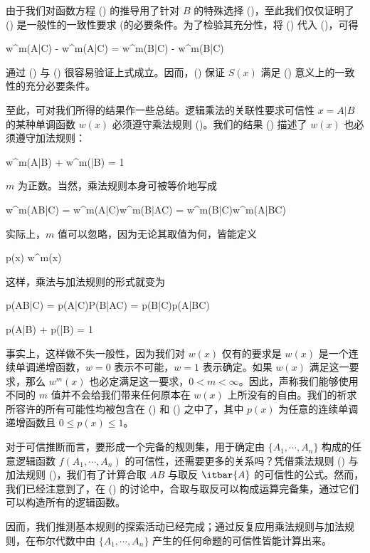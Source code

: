 由于我们对函数方程 (\in[2-45]) 的推导用了针对 $B$ 的特殊选择 (\in[2-41])，至此我们仅仅证明了 (\in[2-58]) 是一般性的一致性要求 (\in[2-40] 的必要条件。为了检验其充分性，将 (\in[2-58]) 代入 (\in[2-40])，可得

\placeformula[2-59]
\startformula
w^m(A|C) - w^m(A|C) = w^m(B|C) - w^m(B|C)
\stopformula

通过 (\in[2-28]) 与 (\in[2-38]) 很容易验证上式成立。因而，(\in[2-58]) 保证 $S(x)$ 满足 (\in[2-40]) 意义上的一致性的充分必要条件。

至此，可对我们所得的结果作一些总结。逻辑乘法的关联性要求可信性 $x = A|B$ 的某种单调函数 $w(x)$ 必须遵守乘法规则 (\in[2-28])。我们的结果 (\in[2-58]) 描述了 $w(x)$ 也必须遵守加法规则：

\placeformula[2-60]
\startformula
w^m(A|B) + w^m(|B) = 1
\stopformula

$m$ 为正数。当然，乘法规则本身可被等价地写成

\placeformula[2-61]
\startformula
w^m(AB|C) = w^m(A|C)w^m(B|AC) = w^m(B|C)w^m(A|BC)
\stopformula

实际上，$m$ 值可以忽略，因为无论其取值为何，皆能定义

\placeformula[2-62]
\startformula
p(x) \equiv w^m(x)
\stopformula

这样，乘法与加法规则的形式就变为

\placeformula[2-63]
\startformula
p(AB|C) = p(A|C)P(B|AC) = p(B|C)p(A|BC)
\stopformula

\placeformula[2-64]
\startformula
p(A|B) + p(|B) = 1
\stopformula

事实上，这样做不失一般性，因为我们对 $w(x)$ 仅有的要求是 $w(x)$ 是一个连续单调递增函数，$w = 0$ 表示不可能，$w = 1$ 表示确定。如果 $w(x)$ 满足这一要求，那么 $w^m(x)$ 也必定满足这一要求，$0 < m < \infty$。因此，声称我们能够使用不同的 $m$ 值并不会给我们带来任何原本在 $w(x)$ 上所没有的自由。我们的祈求所容许的所有可能性均被包含在 (\in[2-63]) 和 (\in[2-64]) 之中了，其中 $p(x)$ 为任意的连续单调递增函数且 $0\le p(x)\le 1$。

对于可信推断而言，要形成一个完备的规则集，用于确定由 $\{A_1,\cdots,A_n\}$ 构成的任意逻辑函数 $f(A_1,\cdots,A_n)$ 的可信性，还需要更多的关系吗？凭借乘法规则 (\in[2-63]) 与加法规则 (\in[2-64])，我们有了计算合取 $AB$ 与取反 $\itbar{A}$ 的可信性的公式。然而，我们已经注意到了，在 (\in[1-23]) 的讨论中，合取与取反可以构成运算完备集，通过它们可以构造所有的逻辑函数。

因而，我们推测基本规则的探索活动已经完成；通过反复应用乘法规则与加法规则，在布尔代数中由 $\{A_1,\cdots,A_n\}$ 产生的任何命题的可信性皆能计算出来。

